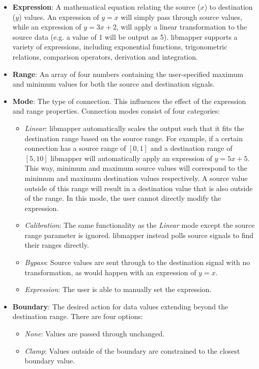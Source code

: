 \begin{itemize}
	\item\textbf{Expression}: A mathematical equation relating the source ($x$) to destination ($y$) values. An expression of $y = x$ will simply pass through source values, while an expression of $y = 3x + 2$, will apply a linear transformation to the source data (e.g. a value of 1 will be output as 5). libmapper supports a variety of expressions, including exponential functions, trigonometric relations, comparison operators, derivation and integration. 
	\item\textbf{Range}: An array of four numbers containing the user-specified maximum and minimum values for both the source and destination signals.
	\item\textbf{Mode}: The type of connection. This influences the effect of the expression and range properties. Connection modes consist of four categories:
	\begin{itemize}
		\item \emph{Linear}: libmapper automatically scales the output such that it fits the destination range based on the source range. For example, if a certain connection has a source range of $[0, 1]$ and a destination range of $[5, 10]$ libmapper will automatically apply an expression of $y = 5x + 5$. This way, minimum and maximum source values will correspond to the minimum and maximum destination values respectively. A source value outside of this range will result in a destination value that is also outside of the range. In this mode, the user cannot directly modify the expression. 
		\item \emph{Calibration}: The same functionality as the \emph{Linear} mode except the source range parameter is ignored. libmapper instead polls source signals to find their ranges directly.
		\item \emph{Bypass}: Source values are sent through to the destination signal with no transformation, as would happen with an expression of $y = x$.
		\item \emph{Expression}: The user is able to manually set the expression.
	\end{itemize}
	\item\textbf{Boundary}: The desired action for data values extending beyond the destination range. There are four options:
	\begin{itemize}
		\item\emph{None}: Values are passed through unchanged.
		\item\emph{Clamp}: Values outside of the boundary are constrained to the closest boundary value.

\end{itemize}
\end{itemize}
